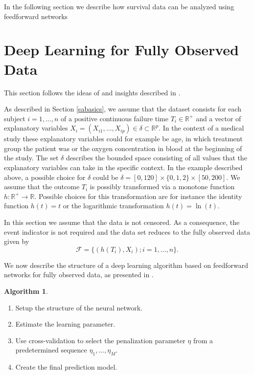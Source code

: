 \documentclass[12pt, a4paper]{scrartcl}
\theoremstyle{definition}
\newtheorem{Algorithm}{Algorithm}[section]
\theoremstyle{plain}
\numberwithin{equation}{section}
\numberwithin{figure}{section}
\numberwithin{table}{section}
\begin{document}
	In the following section we describe how survival data can be analyzed using feedforward networks
	
	\newpage
	
	\section{Deep Learning for Fully Observed Data} \label{uncensored}
	This section follows the ideas of \citet*{basearticle} and insights described in \citet*{deeplbook}.
	
	As described in Section \ref{sabasics}, we assume that the dataset consists for each subject $i = 1,\dots,n$ of a positive continuous failure time $T_i \in \mathbb{R}^+$ and a vector of explanatory variables $X_i = (X_{i1}, \dots , X_{ip}) \in \delta \subset \mathbb{R}^p$.
	In the context of a medical study these explanatory variables could for example be age, in which treatment group the patient was or the oxygen concentration in blood at the beginning of the study.
	The set $\delta$ describes the bounded space consisting of all values that the explanatory variables can take in the specific context.
	In the example described above, a possible choice for $\delta$ could be $\delta = [0, 120] \times \{0,1,2\} \times [50, 200]$.
	We assume that the outcome $T_i$ is possibly transformed via a monotone function $h: \mathbb{R}^+ \rightarrow \mathbb{R}$.
	Possible choices for this transformation are for instance the identity function $h(t)=t$ or the logarithmic transformation $h(t)= \ln (t)$.
	
	In this section we assume that the data is not censored.
	As a consequence, the event indicator is not required and the data set reduces to the fully observed data given by
	\begin{equation*}
	\mathcal{F} =\{ \left( h(T_i), X_i\right); i = 1, \dots, n\}.
	\end{equation*}
	
	We now describe the structure of a deep learning algorithm based on feedforward networks for fully observed data, as presented in \citet*{basearticle}.
	
	\begin{Algorithm}\label{alg:nocensor}
		~
	\begin{enumerate}
		\item Setup the structure of the neural network.
		\item Estimate the learning parameter.
		\item Use cross-validation to select the penalization parameter $\eta$ from a predetermined sequence $\eta_1,\dots,\eta_M$.
		\item Create the final prediction model.
	\end{enumerate}
	\end{Algorithm}
\end{document}
